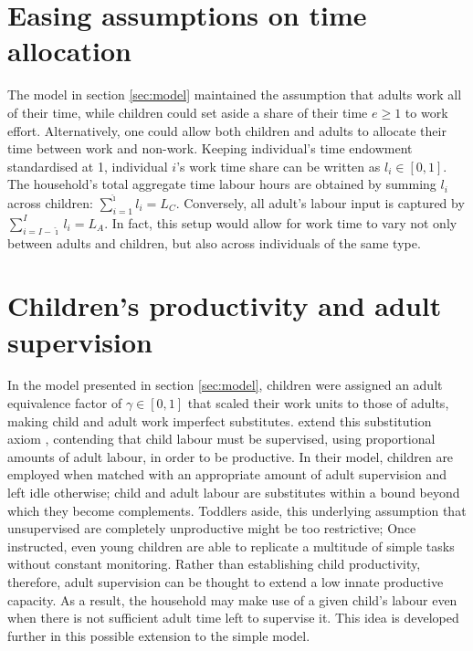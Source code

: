 \documentclass[a4paper,12pt]{article}
\theoremstyle{plain}
\theoremstyle{definition}
\theoremstyle{definition}
\theoremstyle{definition}
\theoremstyle{definition}
\begin{document}
\section{Easing assumptions on time allocation}
\label{app:time_allocation}
The model in section \ref{sec:model} maintained the assumption that adults work all of their time, while children could set aside a share of their time $e\geq1$ to work effort. Alternatively, one could allow both children and adults to allocate their time between work and non-work. Keeping individual's time endowment standardised at 1, individual $i$'s work time share can be written as $l_i\in[0,1]$. The household's total aggregate time labour hours are obtained by summing $l_i$ across children: $\sum_{i=1}^{\hat{\imath}}l_i=L_C$. Conversely, all adult's labour input is captured by $\sum_{i={I-\hat{\imath}}}^I l_i=L_A$. In fact, this setup would allow for work time to vary not only between adults and children, but also across individuals of the same type.

\section{Children's productivity and adult supervision}
\label{app:adult_supervision}
In the model presented in section \ref{sec:model}, children were assigned an adult equivalence factor of $\gamma\in[0,1]$ that scaled their work units to those of adults, making child and adult work imperfect substitutes. \citet{Bar2009} extend this substitution axiom \citep{Basu1998}, contending that child labour must be supervised, using proportional amounts of adult labour, in order to be productive. In their model, children are employed when matched with an appropriate amount of adult supervision and left idle otherwise; child and adult labour are substitutes within a bound beyond which they become complements. Toddlers aside, this underlying assumption that unsupervised are completely unproductive might be too restrictive; Once instructed, even young children are able to replicate a multitude of simple tasks without constant monitoring. Rather than establishing child productivity, therefore, adult supervision can be thought to extend a low innate productive capacity. As a result, the household may make use of a given child's labour even when there is not sufficient adult time left to supervise it. This idea is developed further in this possible extension to the simple model.
\end{document}
